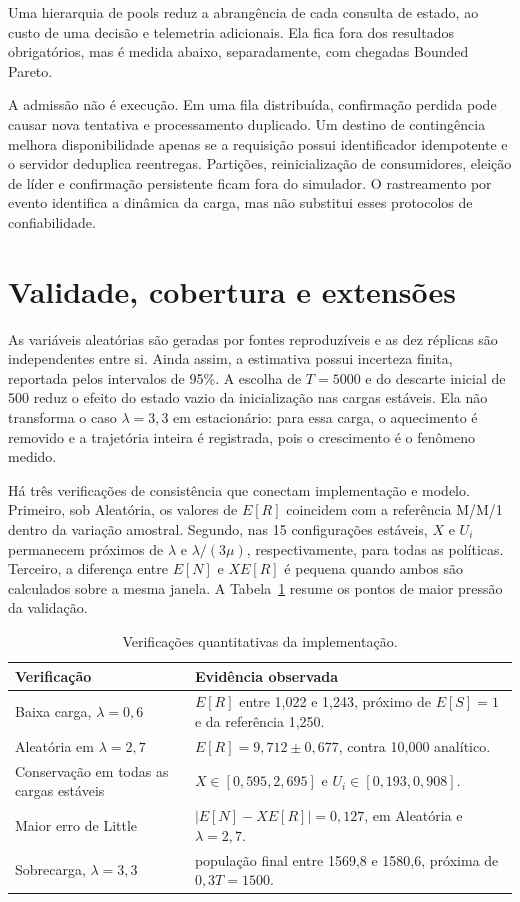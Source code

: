\documentclass[conference]{IEEEtran}
\begin{document}
Uma hierarquia de pools reduz a abrangência de cada consulta de estado, ao custo de uma decisão e telemetria adicionais. Ela fica fora dos resultados obrigatórios, mas é medida abaixo, separadamente, com chegadas Bounded Pareto.

A admissão não é execução. Em uma fila distribuída, confirmação perdida pode causar nova tentativa e processamento duplicado. Um destino de contingência melhora disponibilidade apenas se a requisição possui identificador idempotente e o servidor deduplica reentregas. Partições, reinicialização de consumidores, eleição de líder e confirmação persistente ficam fora do simulador. O rastreamento por evento identifica a dinâmica da carga, mas não substitui esses protocolos de confiabilidade.


\section{Validade, cobertura e extensões}
As variáveis aleatórias são geradas por fontes reproduzíveis e as dez réplicas são independentes entre si. Ainda assim, a estimativa possui incerteza finita, reportada pelos intervalos de 95\%. A escolha de $T=5000$ e do descarte inicial de 500 reduz o efeito do estado vazio da inicialização nas cargas estáveis. Ela não transforma o caso $\lambda=3{,}3$ em estacionário: para essa carga, o aquecimento é removido e a trajetória inteira é registrada, pois o crescimento é o fenômeno medido.

Há três verificações de consistência que conectam implementação e modelo. Primeiro, sob Aleatória, os valores de $E[R]$ coincidem com a referência M/M/1 dentro da variação amostral. Segundo, nas 15 configurações estáveis, $X$ e $U_i$ permanecem próximos de $\lambda$ e $\lambda/(3\mu)$, respectivamente, para todas as políticas. Terceiro, a diferença entre $E[N]$ e $XE[R]$ é pequena quando ambos são calculados sobre a mesma janela. A Tabela~\ref{tab:checks} resume os pontos de maior pressão da validação.

\begin{table}[!t]
\caption{Verificações quantitativas da implementação.}
\label{tab:checks}
\centering
\scriptsize
\begin{tabular}{p{}p{}}
\toprule
Verificação & Evidência observada \\
\midrule
Baixa carga, $\lambda=0{,}6$ & $E[R]$ entre 1,022 e 1,243, próximo de $E[S]=1$ e da referência 1,250. \\
Aleatória em $\lambda=2{,}7$ & $E[R]=9,712\pm0,677$, contra 10,000 analítico. \\
Conservação em todas as cargas estáveis & $X\in[0,595,2,695]$ e $U_i\in[0,193,0,908]$. \\
Maior erro de Little & $|E[N]-XE[R]|=0,127$, em Aleatória e $\lambda=2{,}7$. \\
Sobrecarga, $\lambda=3{,}3$ & população final entre 1569,8 e 1580,6, próxima de $0,3T=1500$. \\
\bottomrule
\end{tabular}
\end{table}
\end{document}
